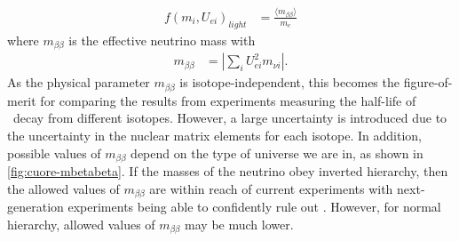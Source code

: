 \begin{align}
        f(m_i, U_{ei})_{light} &= \frac{\langle m_{\beta\beta}\rangle}{m_e}
\end{align}
where $m_{\beta\beta}$ is the effective neutrino mass with
\begin{align}
    m_{\beta\beta}&=|\sum_iU^2_{ei}m_{\nu i}|.
    \label{eq:mbetabeta}
\end{align}
As the physical parameter $m_{\beta\beta}$ is isotope-independent, this becomes the figure-of-merit for comparing the results from experiments measuring the half-life of \zeronubb~decay from different isotopes. However, a large uncertainty is introduced due to the uncertainty in the nuclear matrix elements for each isotope. In addition, possible values of $m_{\beta\beta}$ depend on the type of universe we are in, as shown in \autoref{fig:cuore-mbetabeta}. If the masses of the neutrino obey inverted hierarchy, then the allowed values of $m_{\beta\beta}$ are within reach of current experiments with next-generation experiments being able to confidently rule out \zeronubb. However, for normal hierarchy, allowed values of $m_{\beta\beta}$ may be much lower. 

